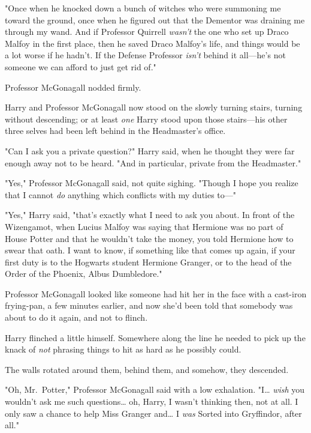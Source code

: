 "Once when he knocked down a bunch of witches who were summoning me toward the
ground, once when he figured out that the Dementor was draining me through my
wand. And if Professor Quirrell \emph{wasn't} the one who set up Draco Malfoy
in the first place, then he saved Draco Malfoy's life, and things would be a
lot worse if he hadn't. If the Defense Professor \emph{isn't} behind it
all---he's not someone we can afford to just get rid of."

Professor McGonagall nodded firmly.

Harry and Professor McGonagall now stood on the slowly turning stairs, turning
without descending; or at least \emph{one} Harry stood upon those stairs---his
other three selves had been left behind in the Headmaster's office.

"Can I ask you a private question?" Harry said, when he thought they were far
enough away not to be heard. "And in particular, private from the Headmaster."

"Yes," Professor McGonagall said, not quite sighing. "Though I hope you realize
that I cannot \emph{do} anything which conflicts with my duties to---"

"Yes," Harry said, "that's exactly what I need to ask you about. In front of
the Wizengamot, when Lucius Malfoy was saying that Hermione was no part of
House Potter and that he wouldn't take the money, you told Hermione how to
swear that oath. I want to know, if something like that comes up again, if your
first duty is to the Hogwarts student Hermione Granger, or to the head of the
Order of the Phoenix, Albus Dumbledore."

Professor McGonagall looked like someone had hit her in the face with a
cast-iron frying-pan, a few minutes earlier, and now she'd been told that
somebody was about to do it again, and not to flinch.

Harry flinched a little himself. Somewhere along the line he needed to pick up
the knack of \emph{not} phrasing things to hit as hard as he possibly could.

The walls rotated around them, behind them, and somehow, they descended.

"Oh, Mr.~Potter," Professor McGonagall said with a low exhalation. "I{\ldots}
\emph{wish} you wouldn't ask me such questions{\ldots} oh, Harry, I wasn't
thinking then, not at all. I only saw a chance to help Miss Granger and{\ldots}
I \emph{was} Sorted into Gryffindor, after all."

